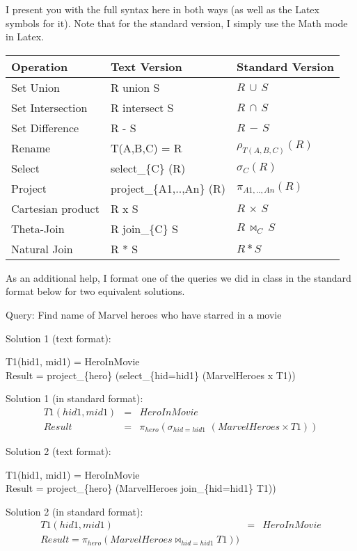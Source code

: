 \documentclass[11pt]{article}
\begin{document}
I present you with the full syntax here in both ways (as well as the
Latex symbols for it). Note that for the standard version, I simply
use the Math mode in Latex.

\begin{tabular}{l|l|l}
  Operation & Text Version & Standard Version \\ \hline
   Set Union & R union S & $R \,\cup\, S $ \\
   Set Intersection & R intersect S & $R \,\cap\, S $ \\
   Set Difference & R - S & $R \,-\, S $ \\
   Rename &   T(A,B,C) = R & $\rho_{T(A,B,C)} (R)$ \\
   Select & select\_\{C\} (R) & $\sigma_{C} (R)$ \\
   Project & project\_\{A1,..,An\} (R) & $\pi_{A1,..,An} (R)$ \\
   Cartesian product & R x S & $R \,\times\, S$ \\
   Theta-Join & R join\_\{C\} S & $R \,\bowtie_{C}\, S$ \\
   Natural Join & R * S & $R * S$ \\
  \end{tabular}

As an additional help, I format one of the queries we did in class in
the standard format below for two equivalent solutions.

Query: Find name of Marvel heroes who have starred in a movie

Solution 1 (text format):

T1(hid1, mid1) = HeroInMovie \\
Result = project\_\{hero\} (select\_\{hid=hid1\} (MarvelHeroes x T1)) 

Solution 1 (in standard format):
\begin{eqnarray*}
T1(hid1, mid1) & =  & HeroInMovie \\
Result &  = & \pi_{hero} (\sigma_{hid=hid1}\,\, (MarvelHeroes \times T1)) 
\end{eqnarray*}

Solution 2 (text format):

T1(hid1, mid1) = HeroInMovie \\
Result = project\_\{hero\} (MarvelHeroes join\_\{hid=hid1\}  T1))

Solution 2 (in standard format):
\begin{eqnarray*}
T1(hid1, mid1) & = & HeroInMovie \\
Result = \pi_{hero} (MarvelHeroes \bowtie_{hid=hid1}  T1))
\end{eqnarray*}
\end{document}
